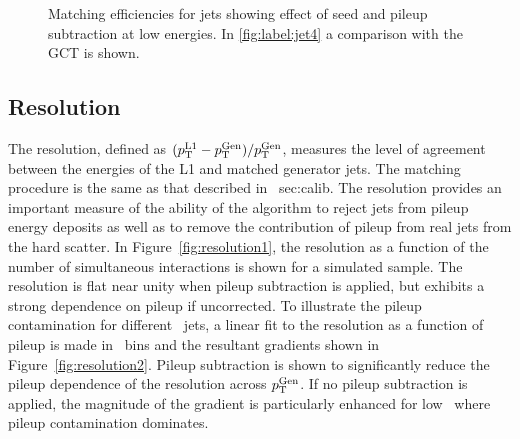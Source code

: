 \begin{figure}
\begin{center}
\caption{Matching efficiencies for jets showing effect of seed and pileup subtraction at low energies. In \ref{fig:label:jet4} 
a comparison with the GCT is shown.}
\label{match}
\end{center}
\end{figure}

\subsection{Resolution}

The resolution, defined as $({p_{\text T}^{\text{L1}}}-{p_{\text T}^{\text{Gen}}})/{p_{\text T}^{\text{Gen}}}$, measures the level of agreement between the energies of the 
L1 and matched generator jets. The matching procedure is the same as that described in \Section~{sec:calib}.
The resolution provides an important measure of the ability of the algorithm to reject jets from pileup
energy deposits as well as to remove the contribution of pileup from real jets from the hard scatter.
In Figure~\ref{fig:resolution1}, the resolution as a function of the number of simultaneous interactions is shown for
a simulated \ttbar sample. The resolution is flat near unity when pileup subtraction is applied,
but exhibits a strong dependence on pileup if uncorrected. To illustrate the pileup contamination for different
\Genpt~jets, a linear fit to the resolution as a function of pileup is made in \Genpt~bins and the resultant gradients
shown in Figure~\ref{fig:resolution2}. Pileup subtraction is shown to significantly reduce the 
pileup dependence of the resolution across ${p_{\text T}^{\text{Gen}}}$. If no pileup subtraction is applied, 
the magnitude of the gradient is particularly enhanced for low \Genpt~where pileup contamination dominates. 

